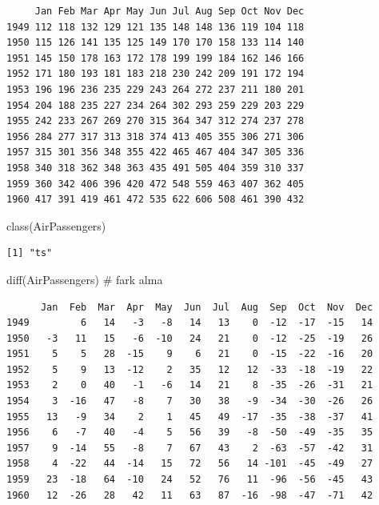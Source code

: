 \documentclass[
  letterpaper,
  DIV=11,
  numbers=noendperiod]{scrreprt}
\newenvironment{Shaded}{\begin{snugshade}}{\end{snugshade}}
\newcommand{\CommentTok}[1]{\textcolor[rgb]{0.37,0.37,0.37}{#1}}
\newcommand{\FunctionTok}[1]{\textcolor[rgb]{0.28,0.35,0.67}{#1}}
\newcommand{\NormalTok}[1]{\textcolor[rgb]{0.00,0.23,0.31}{#1}}
\begin{document}
\begin{verbatim}
     Jan Feb Mar Apr May Jun Jul Aug Sep Oct Nov Dec
1949 112 118 132 129 121 135 148 148 136 119 104 118
1950 115 126 141 135 125 149 170 170 158 133 114 140
1951 145 150 178 163 172 178 199 199 184 162 146 166
1952 171 180 193 181 183 218 230 242 209 191 172 194
1953 196 196 236 235 229 243 264 272 237 211 180 201
1954 204 188 235 227 234 264 302 293 259 229 203 229
1955 242 233 267 269 270 315 364 347 312 274 237 278
1956 284 277 317 313 318 374 413 405 355 306 271 306
1957 315 301 356 348 355 422 465 467 404 347 305 336
1958 340 318 362 348 363 435 491 505 404 359 310 337
1959 360 342 406 396 420 472 548 559 463 407 362 405
1960 417 391 419 461 472 535 622 606 508 461 390 432
\end{verbatim}

\begin{Shaded}
\begin{Highlighting}[]
\FunctionTok{class}\NormalTok{(AirPassengers)}
\end{Highlighting}
\end{Shaded}

\begin{verbatim}
[1] "ts"
\end{verbatim}

\begin{Shaded}
\begin{Highlighting}[]
\FunctionTok{diff}\NormalTok{(AirPassengers) }\CommentTok{\# fark alma}
\end{Highlighting}
\end{Shaded}

\begin{verbatim}
      Jan  Feb  Mar  Apr  May  Jun  Jul  Aug  Sep  Oct  Nov  Dec
1949         6   14   -3   -8   14   13    0  -12  -17  -15   14
1950   -3   11   15   -6  -10   24   21    0  -12  -25  -19   26
1951    5    5   28  -15    9    6   21    0  -15  -22  -16   20
1952    5    9   13  -12    2   35   12   12  -33  -18  -19   22
1953    2    0   40   -1   -6   14   21    8  -35  -26  -31   21
1954    3  -16   47   -8    7   30   38   -9  -34  -30  -26   26
1955   13   -9   34    2    1   45   49  -17  -35  -38  -37   41
1956    6   -7   40   -4    5   56   39   -8  -50  -49  -35   35
1957    9  -14   55   -8    7   67   43    2  -63  -57  -42   31
1958    4  -22   44  -14   15   72   56   14 -101  -45  -49   27
1959   23  -18   64  -10   24   52   76   11  -96  -56  -45   43
1960   12  -26   28   42   11   63   87  -16  -98  -47  -71   42
\end{verbatim}
\end{document}
